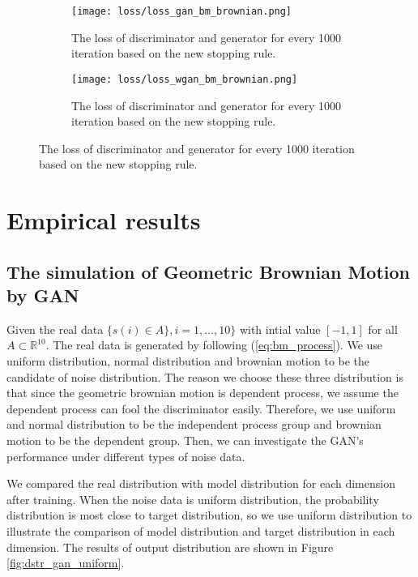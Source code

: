 \documentclass{article}
\begin{document}
	
	
	
	
	
	

	
	\begin{figure}[h]
		\begin{subfigure}[b]{0.5\textwidth}
			\texttt{[image: loss/loss\_gan\_bm\_brownian.png]}
			\caption{The loss of discriminator and generator for every 1000 iteration based on the new stopping rule.}
			\label{fig:loss_gan}
		\end{subfigure}
		\begin{subfigure}[b]{0.45\textwidth}
			\texttt{[image: loss/loss\_wgan\_bm\_brownian.png]}
			\caption{The loss of discriminator and generator for every 1000 iteration based on the new stopping rule.}
			\label{fig:loss_wgan}
		\end{subfigure}
	\end{figure}

		
	\section{Empirical results}
	\subsection{The simulation of Geometric Brownian Motion by GAN}
	
	Given the real data $\{ s(i)\in A \}, i = 1, \dots, 10\}$ with intial value $[-1,1]$ for all $A \subset \mathbb{R}^{10}$.
	The real data is generated by following (\ref{eq:bm_process}).
	We use uniform distribution, normal distribution and brownian motion to be the candidate of noise distribution. 
	The reason we choose these three distribution is that since the geometric brownian motion is dependent process, we assume the dependent process can fool the discriminator easily.
	Therefore, we use uniform and normal distribution to be the independent process group and brownian motion to be the dependent group.
	Then, we can investigate the GAN's performance under different types of noise data.
	
	
	We compared the real distribution with model distribution for each dimension after training. 
	When the noise data is uniform distribution, the probability distribution is most close to target distribution, so we use uniform distribution to illustrate the comparison of model distribution and target distribution in each dimension. 
	The results of output distribution are shown in Figure \ref{fig:dstr_gan_uniform}.
	
\end{document}

